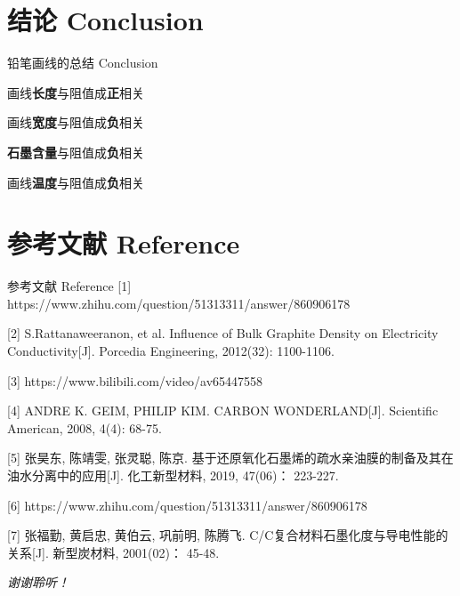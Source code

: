 \documentclass[10pt]{beamer}
\begin{document}
	
	\section[Conclusion]{结论 Conclusion}
	\begin{frame}{铅笔画线的总结 Conclusion}
		\begin{enumerate}
		 {\large \item 画线\textbf{长度}与阻值成\textbf{正}相关
			\item 画线\textbf{宽度}与阻值成\textbf{负}相关
			\item \textbf{石墨含量}与阻值成\textbf{负}相关
			\item 画线\textbf{温度}与阻值成\textbf{负}相关}
		\end{enumerate}
	\end{frame}
	
	\section[Reference]{参考文献 Reference}
	
	\begin{frame}{参考文献 Reference}
		[1] https://www.zhihu.com/question/51313311/answer/860906178
		
		[2] S.Rattanaweeranon, et al. Influence of Bulk Graphite Density on Electricity Conductivity[J]. Porcedia Engineering, 2012(32): 1100-1106.
		
		[3] https://www.bilibili.com/video/av65447558
		
		[4] ANDRE K. GEIM, PHILIP KIM. CARBON WONDERLAND[J]. Scientific American, 2008, 4(4): 68-75.
		
		[5] 张昊东, 陈靖雯, 张灵聪, 陈京. 基于还原氧化石墨烯的疏水亲油膜的制备及其在油水分离中的应用[J]. 化工新型材料, 2019, 47(06)： 223-227.
		
		[6] https://www.zhihu.com/question/51313311/answer/860906178
		
		[7] 张福勤, 黄启忠, 黄伯云, 巩前明, 陈腾飞. C/C复合材料石墨化度与导电性能的关系[J]. 新型炭材料, 2001(02)： 45-48.
	\end{frame}
	
	\begin{frame}
		\begin{center}
			\Huge \textit{谢谢聆听！}
		\end{center}
		
	\end{frame}
\end{document}
